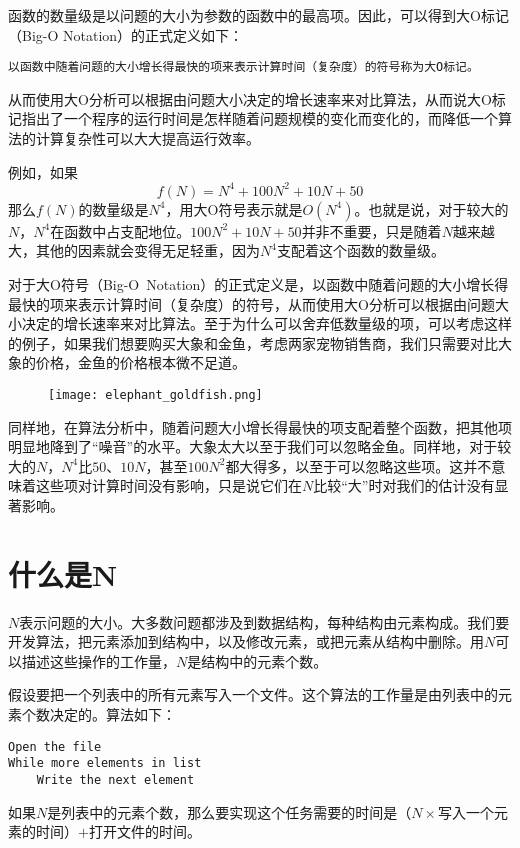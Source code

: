 函数的数量级是以问题的大小为参数的函数中的最高项。因此，可以得到大O标记（Big-O Notation）的正式定义如下：
\begin{verbatim}
以函数中随着问题的大小增长得最快的项来表示计算时间（复杂度）的符号称为大O标记。
\end{verbatim}
从而使用大O分析可以根据由问题大小决定的增长速率来对比算法，从而说大O标记指出了一个程序的运行时间是怎样随着问题规模的变化而变化的，而降低一个算法的计算复杂性可以大大提高运行效率。

例如，如果
\[f(N)=N^4+100N^2+10N+50\]
那么$f(N)$的数量级是$N^4$，用大O符号表示就是$O(N^4)$。也就是说，对于较大的$N$，$N^4$在函数中占支配地位。$100N^2+10N+50$并非不重要，只是随着$N$越来越大，其他的因素就会变得无足轻重，因为$N^4$支配着这个函数的数量级。



对于大O符号（Big-O~Notation）的正式定义是，以函数中随着问题的大小增长得最快的项来表示计算时间（复杂度）的符号，从而使用大O分析可以根据由问题大小决定的增长速率来对比算法。至于为什么可以舍弃低数量级的项，可以考虑这样的例子，如果我们想要购买大象和金鱼，考虑两家宠物销售商，我们只需要对比大象的价格，金鱼的价格根本微不足道。

\begin{figure}[htbp]
\centering
\texttt{[image: elephant\_goldfish.png]}
\end{figure}

同样地，在算法分析中，随着问题大小增长得最快的项支配着整个函数，把其他项明显地降到了“噪音”的水平。大象太大以至于我们可以忽略金鱼。同样地，对于较大的$N$，$N^4$比$50$、$10N$，甚至$100N^2$都大得多，以至于可以忽略这些项。这并不意味着这些项对计算时间没有影响，只是说它们在$N$比较“大”时对我们的估计没有显著影响。


\section{什么是N}


$N$表示问题的大小。大多数问题都涉及到数据结构，每种结构由元素构成。我们要开发算法，把元素添加到结构中，以及修改元素，或把元素从结构中删除。用$N$可以描述这些操作的工作量，$N$是结构中的元素个数。

假设要把一个列表中的所有元素写入一个文件。这个算法的工作量是由列表中的元素个数决定的。算法如下：
\begin{verbatim}
Open the file
While more elements in list
    Write the next element
\end{verbatim}
如果$N$是列表中的元素个数，那么要实现这个任务需要的时间是（$N\times $写入一个元素的时间）$+$打开文件的时间。

